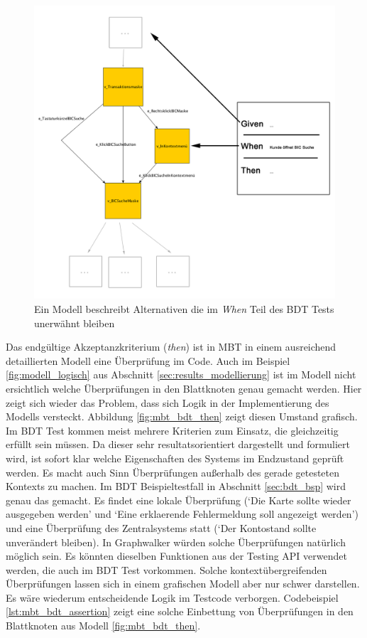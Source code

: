 \begin{figure} 
  \centering
     \includegraphics[width=1\textwidth]{figures/mbt_bdt_when.png}
  \caption{Ein Modell beschreibt Alternativen die im \textit{When} Teil des BDT Tests unerwähnt bleiben}
  \label{fig:mbt_bdt_when}
\end{figure}

Das endgültige Akzeptanzkriterium (\textit{then}) ist in \Gls{MBT} in einem ausreichend detaillierten Modell eine Überprüfung im Code. Auch im Beispiel \ref{fig:modell_logisch} aus Abschnitt \ref{sec:results_modellierung} ist im Modell nicht ersichtlich welche Überprüfungen in den Blattknoten genau gemacht werden. Hier zeigt sich wieder das Problem, dass sich Logik in der Implementierung des Modells versteckt. Abbildung \ref{fig:mbt_bdt_then} zeigt diesen Umstand grafisch. Im \Gls{BDT} Test kommen meist mehrere Kriterien zum Einsatz, die gleichzeitig erfüllt sein müssen. Da dieser sehr resultatsorientiert dargestellt und formuliert wird, ist sofort klar welche Eigenschaften des Systems im Endzustand geprüft werden. Es macht auch Sinn Überprüfungen außerhalb des gerade getesteten Kontexts zu machen. Im \Gls{BDT} Beispieltestfall in Abschnitt \ref{sec:bdt_bsp} wird genau das gemacht. Es findet eine lokale Überprüfung (`Die Karte sollte wieder ausgegeben werden' und `Eine erklaerende Fehlermeldung soll angezeigt werden') und eine Überprüfung des Zentralsystems statt (`Der Kontostand sollte unverändert bleiben). In Graphwalker würden solche Überprüfungen natürlich möglich sein. Es könnten dieselben Funktionen aus der Testing API verwendet werden, die auch im \Gls{BDT} Test vorkommen. Solche kontextübergreifenden Überprüfungen lassen sich in einem grafischen Modell aber nur schwer darstellen. Es wäre wiederum entscheidende Logik im Testcode verborgen. Codebeispiel \ref{lst:mbt_bdt_assertion} zeigt eine solche Einbettung von Überprüfungen in den Blattknoten aus Modell \ref{fig:mbt_bdt_then}.


